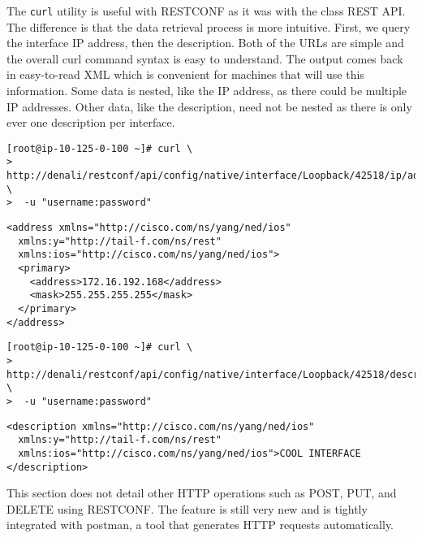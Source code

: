 The \verb|curl| utility is useful with RESTCONF as it was with the class REST
API. The difference is that the data retrieval process is more intuitive.
First, we query the interface IP address, then the description. Both of the
URLs are simple and the overall curl command syntax is easy to understand. The
output comes back in easy-to-read XML which is convenient for machines that
will use this information. Some data is nested, like the IP address, as there
could be multiple IP addresses. Other data, like the description, need not be
nested as there is only ever one description per interface.

\begin{verbatim}
[root@ip-10-125-0-100 ~]# curl \
>  http://denali/restconf/api/config/native/interface/Loopback/42518/ip/address \
>  -u "username:password"
\end{verbatim}

\begin{verbatim}
<address xmlns="http://cisco.com/ns/yang/ned/ios"
  xmlns:y="http://tail-f.com/ns/rest"
  xmlns:ios="http://cisco.com/ns/yang/ned/ios">
  <primary>
    <address>172.16.192.168</address>
    <mask>255.255.255.255</mask>
  </primary>
</address>
\end{verbatim}

\begin{verbatim}
[root@ip-10-125-0-100 ~]# curl \
>  http://denali/restconf/api/config/native/interface/Loopback/42518/description \
>  -u "username:password"
\end{verbatim}

\begin{verbatim}
<description xmlns="http://cisco.com/ns/yang/ned/ios"
  xmlns:y="http://tail-f.com/ns/rest"
  xmlns:ios="http://cisco.com/ns/yang/ned/ios">COOL INTERFACE
</description>
\end{verbatim}

This section does not detail other HTTP operations such as POST, PUT, and
DELETE using RESTCONF. The feature is still very new and is tightly integrated
with postman, a tool that generates HTTP requests automatically.
